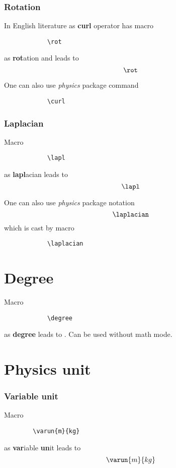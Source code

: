\documentclass{article}
\begin{document}
		\subsubsection*{Rotation}
		In English literature as \textbf{curl} operator has macro 
		\begin{lstlisting}
			\rot
		\end{lstlisting}
		as \textbf{rot}ation and leads to
		\begin{equation*}
			\rot
		\end{equation*}
	
		One can also use \textit{physics} package command
		\begin{lstlisting}
			\curl
		\end{lstlisting}
		
		\subsubsection*{Laplacian}
		Macro
		\begin{lstlisting}
			\lapl
		\end{lstlisting}
		as \textbf{lapl}acian leads to
		\begin{equation*}
			\lapl
		\end{equation*}
	
		One can also use \textit{physics} package notation
		\begin{equation*}
			\laplacian
		\end{equation*}
		which is cast by macro
		\begin{lstlisting}
			\laplacian
		\end{lstlisting}
		
	\section*{Degree}
		Macro
		\begin{lstlisting}
			\degree
		\end{lstlisting}
		as \textbf{degree} leads to \degree. Can be used without math mode.
		
	\section*{Physics unit}
		\subsubsection*{Variable unit}
		Macro
		\begin{lstlisting}
		\varun{m}{kg}
		\end{lstlisting}
		as \textbf{var}iable \textbf{un}it leads to 
		\begin{equation*}
			\varun{m}{kg}
		\end{equation*}
	
\end{document}
